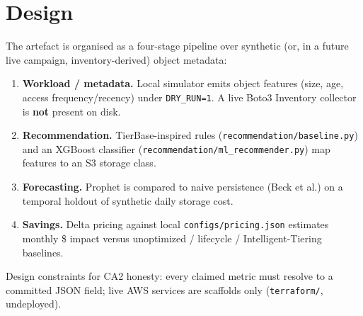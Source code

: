 \chapter{Design}

The artefact is organised as a four-stage pipeline over synthetic (or, in a future live
campaign, inventory-derived) object metadata:

\begin{enumerate}
    \item \textbf{Workload / metadata.} Local simulator emits object features (size, age,
          access frequency/recency) under \texttt{DRY\_RUN=1}. A live Boto3 Inventory
          collector is \textbf{not} present on disk.
    \item \textbf{Recommendation.} TierBase-inspired rules (\texttt{recommendation/baseline.py})
          and an XGBoost classifier (\texttt{recommendation/ml\_recommender.py}) map features
          to an S3 storage class.
    \item \textbf{Forecasting.} Prophet is compared to naive persistence (Beck et al.) on a
          temporal holdout of synthetic daily storage cost.
    \item \textbf{Savings.} Delta pricing against local \texttt{configs/pricing.json} estimates
          monthly \$ impact versus unoptimized / lifecycle / Intelligent-Tiering baselines.
\end{enumerate}

Design constraints for CA2 honesty: every claimed metric must resolve to a committed JSON
field; live AWS services are scaffolds only (\texttt{terraform/}, undeployed).
